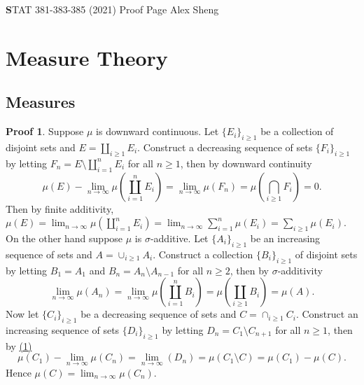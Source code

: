 \documentclass[hidelinks,11pt]{article}
\theoremstyle{definition}
\theoremstyle{dotless}
\newtheorem{prop}{Proof}[section]
\theoremstyle{remark}
\DeclareMathOperator{\1}{\mathbf{1}}
\DeclareMathOperator{\0}{\mathbf{0}}
\begin{document}
\begin{center}
{\Large\textbf STAT 381-383-385 (2021) \hspace{0.1cm} Proof Page}\medbreak
\large{Alex Sheng}
\end{center}

\section{Measure Theory}

\subsection{Measures}

\begin{prop}
Suppose $\mu$ is downward continuous. Let $\{E_i\}_{i\geq1}$ be a collection of disjoint sets and $E=\amalg_{i\geq1}E_i$. Construct a decreasing sequence of sets $\{F_i\}_{i\geq1}$ by letting
$F_n=E\setminus\amalg_{i=1}^nE_i$ for all $n\geq1$, then by downward continuity
\[\mu(E)-\lim_{n\to\infty}\mu(\coprod_{i=1}^nE_i)=\lim_{n\to\infty}\mu(F_n)=\mu(\bigcap_{i\geq1}F_i)=0.\]
Then by finite additivity, $\mu(E)=\lim_{n\to\infty}\mu(\amalg_{i=1}^nE_i)=\lim_{n\to\infty}\sum_{i=1}^n\mu(E_i)=\sum_{i\geq1}\mu(E_i)$.\medbreak
On the other hand suppose $\mu$ is $\sigma$-additive.
Let $\{A_i\}_{i\geq1}$ be an increasing sequence of sets and $A=\cup_{i\geq1}A_i$. Construct a collection $\{B_i\}_{i\geq1}$ of disjoint sets by letting $B_1=A_1$ and $B_n=A_n\setminus A_{n-1}$ for all $n\geq2$, then by $\sigma$-additivity
\begin{equation}\label{(1)}
    \lim_{n\to\infty}\mu(A_n)=\lim_{n\to\infty}\mu(\coprod_{i=1}^nB_i)=\mu(\coprod_{i\geq1}B_i)=\mu(A).
\end{equation}
Now let $\{C_i\}_{i\geq1}$ be a decreasing sequence of sets and $C=\cap_{i\geq1}C_i$. Construct an increasing sequence of sets $\{D_i\}_{i\geq1}$ by letting $D_n=C_1\setminus C_{n+1}$ for all $n\geq1$, then by \hyperref[(1)]{(1)}
\[\mu(C_1)-\lim_{n\to\infty}\mu(C_n)=\lim_{n\to\infty}(D_n)=\mu(C_1\setminus C)=\mu(C_1)-\mu(C).\]
Hence $\mu(C)=\lim_{n\to\infty}\mu(C_n)$.
\end{prop}
\end{document}
